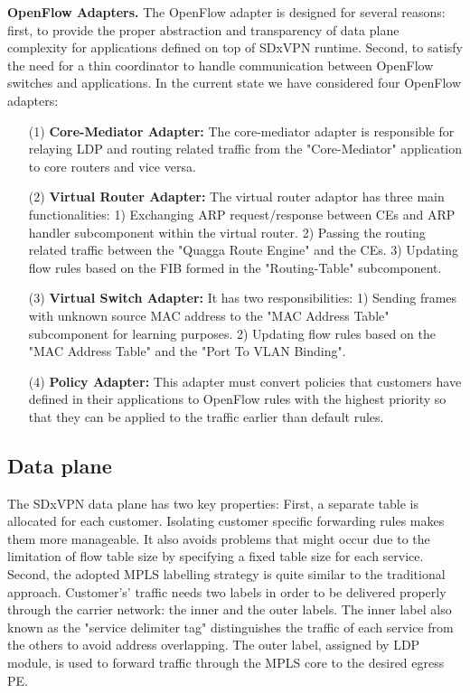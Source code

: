 \documentclass[10pt,conference]{IEEEtran}
\begin{document}
\textbf {OpenFlow Adapters.} The OpenFlow adapter is designed for several reasons: first, to provide  the proper abstraction and transparency of data plane complexity for applications defined on top of SDxVPN runtime. Second, to satisfy the need for a thin coordinator to handle communication between OpenFlow switches and applications.
In the current state we have considered four OpenFlow adapters:
\begin{enumerate}
\item[(1)] \textbf {Core-Mediator Adapter:} The core-mediator adapter is responsible for relaying LDP and routing related traffic from the "Core-Mediator" application to core routers and vice versa.\item[(2)] \textbf {Virtual Router Adapter:} The virtual router adaptor
has three main functionalities: 1) Exchanging ARP request/response between CEs and ARP handler subcomponent within the virtual router. 2) Passing the routing related traffic between the "Quagga Route Engine" and the CEs. 3) Updating flow rules based on the FIB formed in the "Routing-Table" subcomponent.
\item[(3)] \textbf {Virtual Switch Adapter:} It has two responsibilities: 1) Sending frames with unknown source MAC address to the "MAC Address Table" subcomponent for learning purposes. 2) Updating flow rules based on the "MAC Address Table" and the "Port To VLAN Binding".

\item[(4)] \textbf {Policy Adapter:} This adapter must convert policies that customers have defined in their applications to OpenFlow rules with the highest priority so that they can be applied to the traffic earlier than default rules.\end{enumerate}






\subsection{Data plane}



The SDxVPN data plane has two key properties: First, a separate table is allocated for each customer. Isolating customer specific forwarding rules makes them more manageable. It also avoids problems that might occur due to the limitation of flow table size by specifying a fixed table size for each service. Second, the adopted MPLS labelling strategy is quite similar to the traditional approach. Customer’s' traffic needs two labels in order to be delivered properly through the carrier network: the inner and the outer labels. The inner label also known as the "service delimiter tag" distinguishes the traffic of each service from the others to avoid address overlapping. The outer label, assigned by LDP module, is used to forward traffic through the MPLS core to the desired egress PE.
\end{document}
